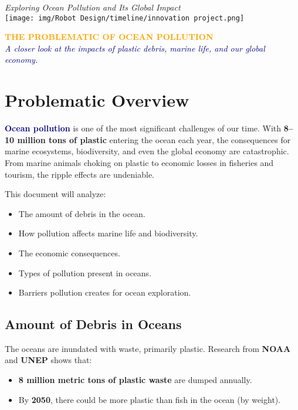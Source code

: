 \vfill 

\begin{center}
    \vspace{2cm}
    \textit{Exploring Ocean Pollution and Its Global Impact}\\[2cm]
    \texttt{[image: img/Robot Design/timeline/innovation project.png]} 
\end{center}
\newpage


\begin{center}
    \huge \textbf{\textcolor{orange}{THE PROBLEMATIC OF OCEAN POLLUTION}} \\[0.5cm]
    \large \textit{\textcolor{navy}{A closer look at the impacts of plastic debris, marine life, and our global economy.}}
\end{center}

\section{Problematic Overview}
\textbf{\textcolor{navy}{Ocean pollution}} is one of the most significant challenges of our time. With \textbf{8–10 million tons of plastic} entering the ocean each year, the consequences for marine ecosystems, biodiversity, and even the global economy are catastrophic. From marine animals choking on plastic to economic losses in fisheries and tourism, the ripple effects are undeniable.

This document will analyze:
\begin{itemize}
    \item The amount of debris in the ocean.
    \item How pollution affects marine life and biodiversity.
    \item The economic consequences.
    \item Types of pollution present in oceans.
    \item Barriers pollution creates for ocean exploration.
\end{itemize}

\subsection{Amount of Debris in Oceans}
The oceans are inundated with waste, primarily plastic. Research from \textbf{NOAA} and \textbf{UNEP} shows that:
\begin{itemize}
    \item \textbf{8 million metric tons of plastic waste} are dumped annually.
    \item By \textbf{2050}, there could be more plastic than fish in the ocean (by weight).
\end{itemize}

